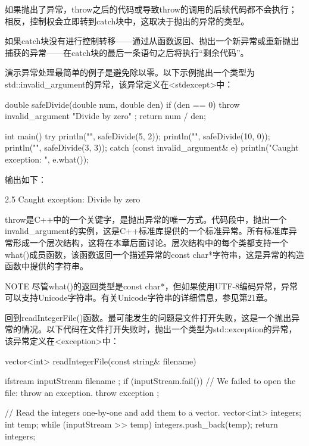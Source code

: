 如果抛出了异常，throw之后的代码或导致throw的调用的后续代码都不会执行；相反，控制权会立即转到catch块中，这取决于抛出的异常的类型。

如果catch块没有进行控制转移——通过从函数返回、抛出一个新异常或重新抛出捕获的异常——在catch块的最后一条语句之后将执行“剩余代码”。

演示异常处理最简单的例子是避免除以零。以下示例抛出一个类型为std::invalid\_argument的异常，该异常定义在<stdexcept>中：

\begin{cpp}
double safeDivide(double num, double den)
{
    if (den == 0) { throw invalid_argument { "Divide by zero" }; }
    return num / den;
}

int main()
{
    try {
        println("{}", safeDivide(5, 2));
        println("{}", safeDivide(10, 0));
        println("{}", safeDivide(3, 3));
    } catch (const invalid_argument& e) {
        println("Caught exception: {}", e.what());
    }
}
\end{cpp}

输出如下：

\begin{shell}
2.5
Caught exception: Divide by zero
\end{shell}

throw是C++中的一个关键字，是抛出异常的唯一方式。代码段中，抛出一个invalid\_argument的实例，这是C++标准库提供的一个标准异常。所有标准库异常形成一个层次结构，这将在本章后面讨论。层次结构中的每个类都支持一个what()成员函数，该函数返回一个描述异常的const char*字符串，这是异常的构造函数中提供的字符串。

\begin{myNotic}{NOTE}
尽管what()的返回类型是const char*，但如果使用UTF-8编码异常，异常可以支持Unicode字符串。有关Unicode字符串的详细信息，参见第21章。
\end{myNotic}

回到readIntegerFile()函数。最可能发生的问题是文件打开失败，这是一个抛出异常的情况。以下代码在文件打开失败时，抛出一个类型为std::exception的异常，该异常定义在<exception>中：

\begin{cpp}
vector<int> readIntegerFile(const string& filename)
{
    ifstream inputStream { filename };
    if (inputStream.fail()) {
        // We failed to open the file: throw an exception.
        throw exception {};
    }

    // Read the integers one-by-one and add them to a vector.
    vector<int> integers;
    int temp;
    while (inputStream >> temp) {
        integers.push_back(temp);
    }
    return integers;
}
\end{cpp}

